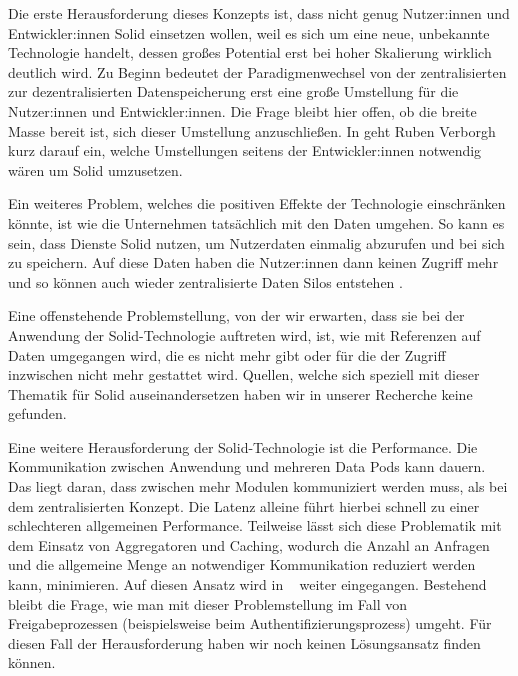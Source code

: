 \documentclass[acmtog]{acmart}
\begin{document}
Die erste Herausforderung dieses Konzepts ist, dass nicht genug Nutzer:innen und Entwickler:innen Solid einsetzen wollen, weil es sich um eine neue, unbekannte Technologie handelt, dessen großes Potential erst bei hoher Skalierung wirklich deutlich wird. Zu Beginn bedeutet der Paradigmenwechsel von der zentralisierten zur dezentralisierten Datenspeicherung erst eine große Umstellung für die Nutzer:innen und Entwickler:innen. Die Frage bleibt hier offen, ob die breite Masse bereit ist, sich dieser Umstellung anzuschließen. 
In  \cite{MarcoNeumann.2021}  geht Ruben Verborgh kurz darauf ein, welche Umstellungen seitens der Entwickler:innen notwendig wären um Solid umzusetzen.

Ein weiteres Problem, welches die positiven Effekte der Technologie einschränken könnte, ist wie die Unternehmen tatsächlich mit den Daten umgehen. So kann es sein, dass Dienste Solid nutzen, um Nutzerdaten einmalig abzurufen und bei sich zu speichern. Auf diese Daten haben die Nutzer:innen dann keinen Zugriff mehr und so können auch wieder zentralisierte Daten Silos entstehen \cite{MarcoNeumann.2021} .

Eine offenstehende Problemstellung, von der wir erwarten, dass sie bei der Anwendung der Solid-Technologie auftreten wird, ist, wie mit Referenzen auf Daten umgegangen wird, die es nicht mehr gibt oder für die der Zugriff inzwischen nicht mehr gestattet wird. Quellen, welche sich speziell mit dieser Thematik für Solid auseinandersetzen haben wir in unserer Recherche keine gefunden.

Eine weitere Herausforderung der Solid-Technologie ist die Performance. Die Kommunikation zwischen Anwendung und mehreren Data Pods kann dauern. Das liegt daran, dass zwischen mehr Modulen kommuniziert werden muss, als bei dem zentralisierten Konzept. Die Latenz alleine führt hierbei schnell zu einer schlechteren allgemeinen Performance. Teilweise lässt sich diese Problematik mit dem Einsatz von Aggregatoren und Caching, wodurch die Anzahl an Anfragen und die allgemeine Menge an notwendiger Kommunikation reduziert werden kann, minimieren. Auf diesen Ansatz wird in  ~\cite{MarcoNeumann.2021} weiter eingegangen. Bestehend bleibt die Frage, wie man mit dieser Problemstellung im Fall von Freigabeprozessen (beispielsweise beim Authentifizierungsprozess) umgeht. Für diesen Fall der Herausforderung haben wir noch keinen Lösungsansatz finden können.
\end{document}

